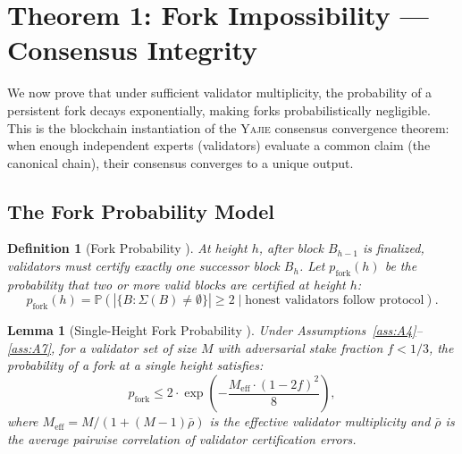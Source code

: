 \documentclass[11pt,a4paper]{article}
\newtheorem{lemma}[theorem]{Lemma}
\newtheorem{definition}[theorem]{Definition}
\theoremstyle{definition}
\newcommand{\Yajie}{\textsc{Yajie}}
\newcommand{\Pbb}{\mathbb{P}}
\begin{document}
\section{Theorem 1: Fork Impossibility — Consensus Integrity}
\label{sec:fork}
We now prove that under sufficient validator multiplicity, the probability of a persistent fork decays exponentially, making forks probabilistically negligible. This is the blockchain instantiation of the \Yajie{} consensus convergence theorem: when enough independent experts (validators) evaluate a common claim (the canonical chain), their consensus converges to a unique output.
\subsection{The Fork Probability Model}
\begin{definition}[Fork Probability ]
\label{def:fork_prob}
At height $h$, after block $B_{h-1}$ is finalized, validators must certify exactly one successor block $B_h$. Let $p_{\mathrm{fork}}(h)$ be the probability that two or more valid blocks are certified at height $h$:
\begin{equation}
    p_{\mathrm{fork}}(h) = \Pbb(|\{B : \Sigma(B) \neq \emptyset\}| \geq 2 \mid \text{honest validators follow protocol}).
    \label{eq:fork_prob}
\end{equation}
\end{definition}
\begin{lemma}[Single-Height Fork Probability ]
\label{lem:single_fork}
Under Assumptions~\ref{ass:A4}--\ref{ass:A7}, for a validator set of size $M$ with adversarial stake fraction $f < 1/3$, the probability of a fork at a single height satisfies:
\begin{equation}
    p_{\mathrm{fork}} \leq 2 \cdot \exp\left(-\frac{M_{\mathrm{eff}} \cdot (1 - 2f)^2}{8}\right),
    \label{eq:fork_bound}
\end{equation}
where $M_{\mathrm{eff}} = M / (1 + (M-1)\bar{\rho})$ is the effective validator multiplicity and $\bar{\rho}$ is the average pairwise correlation of validator certification errors.
\end{lemma}
\end{document}
